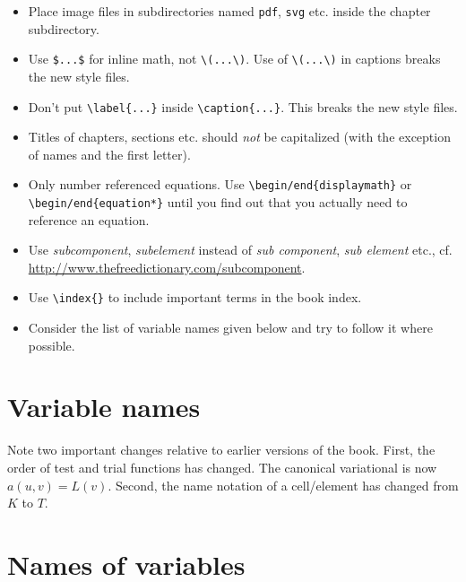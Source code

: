 \documentclass{article}
\begin{document}
\begin{itemize}
  Where possible, use \verb|width=\smallfig| or \verb|width=\largefig|
  to specify image sizes.
\item
  Place image files in subdirectories named \verb|pdf|, \verb|svg|
  etc. inside the chapter subdirectory.
\item
  Use \verb|$...$| for inline math, not \verb|\(...\)|. Use of
  \verb|\(...\)| in captions breaks the new style files.
\item
  Don't put \verb|\label{...}| inside \verb|\caption{...}|. This
  breaks the new style files.
\item
  Titles of chapters, sections etc. should \emph{not} be capitalized
  (with the exception of names and the first letter).
\item
  Only number referenced equations. Use \verb|\begin/end{displaymath}|
  or \verb|\begin/end{equation*}| until you find out that you actually
  need to reference an equation.
\item
  Use \emph{subcomponent}, \emph{subelement} instead of \emph{sub
    component}, \emph{sub element} etc.,
  cf. \url{http://www.thefreedictionary.com/subcomponent}.
\item
  Use \verb|\index{}| to include important terms in the book index.
\item
  Consider the list of variable names given below and try to follow it
  where possible.
\end{itemize}

\section*{Variable names}

Note two important changes relative to earlier versions of the
book. First, the order of test and trial functions has changed. The
canonical variational is now $a(u, v) = L(v)$. Second, the name
notation of a cell/element has changed from $K$ to $T$.

\section*{Names of variables}
\end{document}
